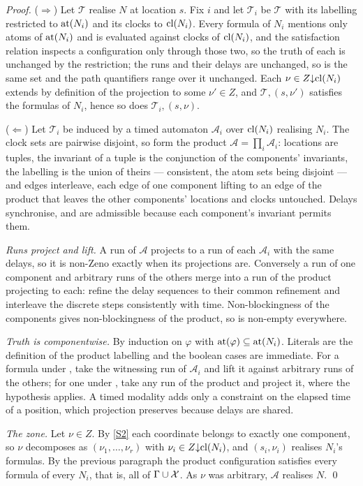 \begin{proof}
($\Rightarrow$) Let $\mathcal T$ realise $N$ at location $s$. Fix $i$ and let
$\mathcal T_i$ be $\mathcal T$ with its labelling restricted to $\mathrm{at}(N_i)$
and its clocks to $\mathrm{cl}(N_i)$. Every formula of $N_i$ mentions only atoms of
$\mathrm{at}(N_i)$ and is evaluated against clocks of $\mathrm{cl}(N_i)$, and the
satisfaction relation inspects a configuration only through those two, so the
truth of each is unchanged by the restriction; the runs and their delays are
unchanged, so \Runsinf is the same set and the path quantifiers range over it
unchanged. Each $\nu\in Z{\downarrow}\mathrm{cl}(N_i)$ extends by definition of the
projection to some $\nu'\in Z$, and $\mathcal T,(s,\nu')$ satisfies the formulas
of $N_i$, hence so does $\mathcal T_i,(s,\nu)$.

($\Leftarrow$) Let $\mathcal T_i$ be induced by a timed automaton
$\mathcal A_i$ over $\mathrm{cl}(N_i)$ realising $N_i$. The clock sets are pairwise
disjoint, so form the product $\mathcal A=\prod_i\mathcal A_i$: locations are
tuples, the invariant of a tuple is the conjunction of the components'
invariants, the labelling is the union of theirs --- consistent, the atom sets
being disjoint --- and edges interleave, each edge of one component lifting to
an edge of the product that leaves the other components' locations and clocks
untouched. Delays synchronise, and are admissible because each component's
invariant permits them.

\emph{Runs project and lift.} A run of $\mathcal A$ projects to a run of each
$\mathcal A_i$ with the same delays, so it is non-Zeno exactly when its
projections are. Conversely a run of one component and arbitrary runs of the
others merge into a run of the product projecting to each: refine the delay
sequences to their common refinement and interleave the discrete steps
consistently with time. Non-blockingness of the components gives
non-blockingness of the product, so \Runsinf is non-empty everywhere.

\emph{Truth is componentwise.} By induction on $\varphi$ with
$\mathrm{at}(\varphi)\subseteq\mathrm{at}(N_i)$. Literals are the definition of the
product labelling and the boolean cases are immediate. For a formula under \Ev,
take the witnessing run of $\mathcal A_i$ and lift it against arbitrary runs of
the others; for one under \Av, take any run of the product and project it, where
the hypothesis applies. A timed modality adds only a constraint on the elapsed
time of a position, which projection preserves because delays are shared.

\emph{The zone.} Let $\nu\in Z$. By \ref{S2} each coordinate belongs to exactly
one component, so $\nu$ decomposes as $(\nu_1,\dots,\nu_r)$ with
$\nu_i\in Z{\downarrow}\mathrm{cl}(N_i)$, and $(s_i,\nu_i)$ realises $N_i$'s formulas.
By the previous paragraph the product configuration satisfies every formula of
every $N_i$, that is, all of $\Gamma\cup\mathcal{X}$. As $\nu$ was arbitrary,
$\mathcal A$ realises $N$. \qed
\end{proof}

